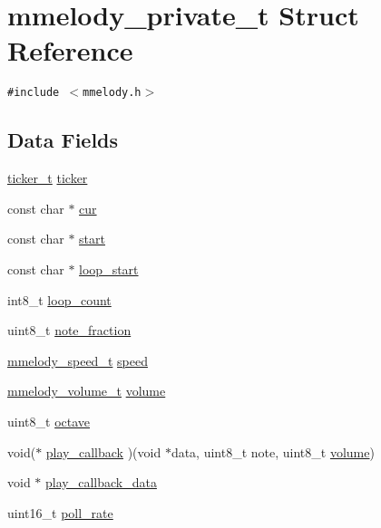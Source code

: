 \hypertarget{structmmelody__private__t}{
\section{mmelody\_\-private\_\-t Struct Reference}
\label{structmmelody__private__t}
}
{\tt \#include $<$mmelody.h$>$}

\subsection*{Data Fields}
\begin{CompactItemize}
\item 
\hyperlink{structticker__t}{ticker\_\-t} \hyperlink{structmmelody__private__t_a87534879a34764ca8706fab5aab993e}{ticker}
\item 
const char $\ast$ \hyperlink{structmmelody__private__t_c99d0ddec5abf76765529846c1c7e4d8}{cur}
\item 
const char $\ast$ \hyperlink{structmmelody__private__t_c3a07b44702142a79267f35a60e7cd77}{start}
\item 
const char $\ast$ \hyperlink{structmmelody__private__t_334763e1e4d9d12a80188e41492a25a4}{loop\_\-start}
\item 
int8\_\-t \hyperlink{structmmelody__private__t_400cd0e27228c0ef7ccffb2fec46d7a5}{loop\_\-count}
\item 
uint8\_\-t \hyperlink{structmmelody__private__t_381c6b139bb4fb5630eb9639f8b57b4a}{note\_\-fraction}
\item 
\hyperlink{mmelody_8h_f40a0ae32aa38b871c87fd3e909e5042}{mmelody\_\-speed\_\-t} \hyperlink{structmmelody__private__t_97d560b5c8a9ce70d4064d02c29db281}{speed}
\item 
\hyperlink{mmelody_8h_59dfa5e88b3098a69af0aed19e7d1147}{mmelody\_\-volume\_\-t} \hyperlink{structmmelody__private__t_392d14ffcc6e5510349d8a7ef7da593e}{volume}
\item 
uint8\_\-t \hyperlink{structmmelody__private__t_7dea2b1d92501ff4fa579eb07e56f9a5}{octave}
\item 
void($\ast$ \hyperlink{structmmelody__private__t_5b9291604e0066d7fea5ead273e58fd8}{play\_\-callback} )(void $\ast$data, uint8\_\-t note, uint8\_\-t \hyperlink{structmmelody__private__t_392d14ffcc6e5510349d8a7ef7da593e}{volume})
\item 
void $\ast$ \hyperlink{structmmelody__private__t_17170c6a0f5b7b444de5b4faa8a6d194}{play\_\-callback\_\-data}
\item 
uint16\_\-t \hyperlink{structmmelody__private__t_838a62c5c15a98ab15702ccd0168fc54}{poll\_\-rate}
\end{CompactItemize}


